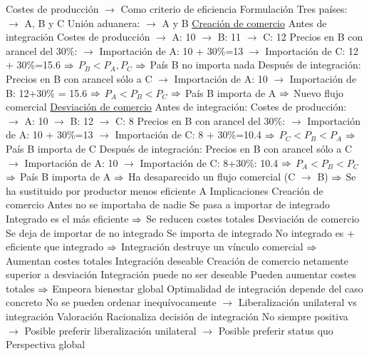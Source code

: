 \documentclass{nuevotema}
\begin{document}
\begin{esquemal}
				\4 Costes de producción
				\4[] $\to$ Como criterio de eficiencia
			\3 Formulación
				\4 Tres países:
				\4[] $\to$ A, B y C
				\4 Unión aduanera:
				\4[] $\to$ A y B
				\4 \underline{Creación de comercio}
				\4 Antes de integración
				\4[] Costes de producción
				\4[] $\to$ A: 10
				\4[] $\to$ B: 11
				\4[] $\to$ C: 12
				\4[] Precios en B con arancel del 30\%:
				\4[] $\to$ Importación de A: 10 + 30\%=13
				\4[] $\to$ Importación de C: 12 + 30\%=15.6
				\4[] $\Rightarrow$ $P_B < P_A, P_C$
				\4[] $\Rightarrow$ País B no importa nada
				\4 Después de integración:
				\4[] Precios en B con arancel sólo a C
				\4[] $\to$ Importación de A: 10
				\4[] $\to$ Importación de B: 12+30\% = 15.6
				\4[] $\Rightarrow$ $P_A < P_B < P_C$
				\4[] $\Rightarrow$ País B importa de A
				\4[] $\Rightarrow$ Nuevo flujo comercial
				\4 \underline{Desviación de comercio}
				\4 Antes de integración:
				\4[] Costes de producción:
				\4[] $\to$ A: 10
				\4[] $\to$ B: 12
				\4[] $\to$ C: 8
				\4[] Precios en B con arancel del 30\%:
				\4[] $\to$ Importación de A: 10 + 30\%=13
				\4[] $\to$ Importación de C: 8 + 30\%=10.4
				\4[] $\Rightarrow$ $P_C < P_B < P_A$
				\4[] $\Rightarrow$ País B importa de C
				\4 Después de integración:
				\4[] Precios en B con arancel sólo a C
				\4[] $\to$ Importación de A: 10
				\4[] $\to$ Importación de C: 8+30\%: 10.4
				\4[] $\Rightarrow$ $P_A < P_B < P_C$
				\4[] $\Rightarrow$ País B importa de A
				\4[] $\Rightarrow$ Ha desaparecido un flujo comercial (C $\to$ B)
				\4[] $\Rightarrow$ Se ha sustituido por productor menos eficiente A
			\3 Implicaciones
				\4 Creación de comercio
				\4[] Antes no se importaba de nadie
				\4[] Se pasa a importar de integrado
				\4[] Integrado es el más eficiente
				\4[] $\Rightarrow$ Se reducen costes totales
				\4 Desviación de comercio
				\4[] Se deja de importar de no integrado
				\4[] Se importa de integrado
				\4[] No integrado es + eficiente que integrado
				\4[] $\Rightarrow$ Integración destruye un vínculo comercial
				\4[] $\Rightarrow$ Aumentan costes totales
				\4 Integración deseable
				\4[] Creación de comercio netamente superior a desviación
				\4 Integración puede no ser deseable
				\4[] Pueden aumentar costes totales
				\4[] $\Rightarrow$ Empeora bienestar global
				\4 Optimalidad de integración depende del caso concreto
				\4[] No se pueden ordenar inequívocamente
				\4[] $\to$ Liberalización unilateral vs integración
			\3 Valoración
				\4 Racionaliza decisión de integración
				\4[] No siempre positiva
				\4[] $\to$ Posible preferir liberalización unilateral
				\4[] $\to$ Posible preferir status quo
				\4[] Perspectiva global

\end{esquemal}
\end{document}
